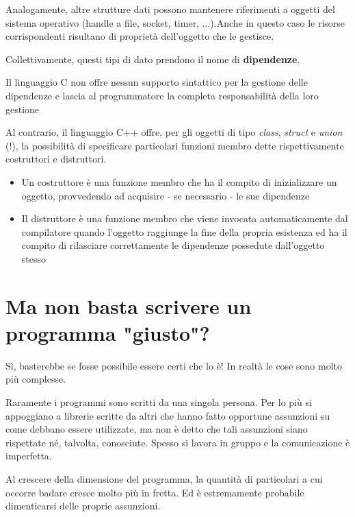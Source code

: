 Analogamente, altre strutture dati possono mantenere riferimenti a oggetti del
sistema operativo (handle a file, socket, timer, ...).Anche in questo caso le risorse corrispondenti risultano di proprietà dell'oggetto che le gestisce.


Collettivamente, questi tipi di dato prendono il nome di \textbf{dipendenze}.\newline

Il linguaggio C non offre nessun supporto sintattico per la gestione delle dipendenze
e lascia al programmatore la completa responsabilità della loro gestione


Al contrario, il linguaggio C++ offre, per gli oggetti di tipo \textit{class}, \textit{struct} e \textit{union} (!), la possibilità di specificare particolari funzioni membro dette rispettivamente costruttori e distruttori.

\begin{itemize}
  \item Un costruttore è una funzione membro che ha il compito di inizializzare un oggetto, provvedendo ad acquisire - se necessario - le sue dipendenze
  \item Il distruttore è una funzione membro che viene invocata automaticamente dal compilatore quando l'oggetto raggiunge la fine della propria esistenza ed ha il compito di rilasciare correttamente le dipendenze possedute dall'oggetto stesso
\end{itemize}



\section{Ma non basta scrivere un programma "giusto"?  }

Sì, basterebbe se fosse possibile essere certi che lo è! In realtà le cose sono molto più complesse.

Raramente i programmi sono scritti da una singola persona. Per lo più si appoggiano a librerie scritte da altri che hanno fatto opportune assunzioni su come debbano essere utilizzate, ma non è detto che tali assunzioni siano rispettate né, talvolta, conosciute. Spesso si lavora in gruppo e la comunicazione è imperfetta.

Al crescere della dimensione del programma, la quantità di particolari a cui occorre
badare cresce molto più in fretta. Ed è estremamente probabile dimenticarsi delle proprie assunzioni.



